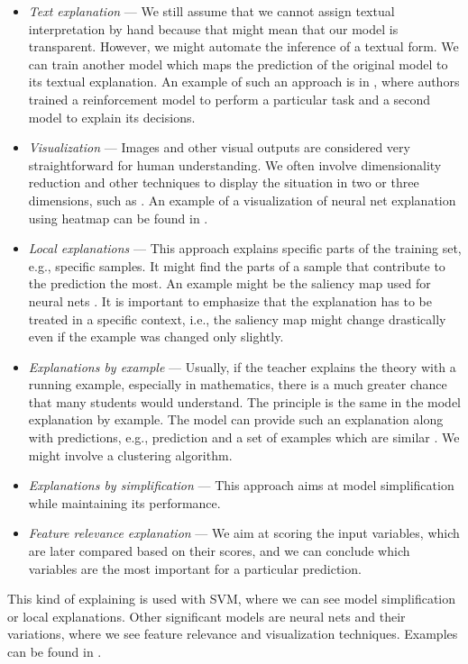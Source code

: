 \begin{itemize}
    \itemsep0em 
    \item \emph{Text explanation} --- We still assume that we cannot assign textual interpretation by hand because that might mean that our model is transparent. However, we might automate the inference of a textual form. We can train another model which maps the prediction of the original model to its textual explanation. An example of such an approach is in \cite{Krening2017}, where authors trained a reinforcement model to perform a particular task and a second model to explain its decisions.
    \item \emph{Visualization} --- Images and other visual outputs are considered very straightforward for human understanding. We often involve dimensionality reduction and other techniques to display the situation in two or three dimensions, such as \cite{Pearson1901}. An example of a visualization of neural net explanation using heatmap can be found in \cite{Zeiler2013}.
    \item \emph{Local explanations} --- This approach explains specific parts of the training set, e.g.,  specific samples. It might find the parts of a sample that contribute to the prediction the most. An example might be the saliency map used for neural nets \cite{Simonyan2014}. It is important to emphasize that the explanation has to be treated in a specific context, i.e., the saliency map might change drastically even if the example was changed only slightly.
    \item \emph{Explanations by example} --- Usually, if the teacher explains the theory with a running example, especially in mathematics, there is a much greater chance that many students would understand. The principle is the same in the model explanation by example. The model can provide such an explanation along with predictions, e.g., prediction and a set of examples which are similar  \cite{Caruana1999}. We might involve a clustering algorithm.
    \item \emph{Explanations by simplification} --- This approach aims at model simplification while maintaining its performance.
    \item \emph{Feature relevance explanation} --- We aim at scoring the input variables, which are later compared based on their scores, and we can conclude which variables are the most important for a particular prediction.
\end{itemize}

This kind of explaining is used with SVM, where we can see model simplification or local explanations. Other significant models are neural nets and their variations, where we see feature relevance and visualization techniques. Examples can be found in \cite{Arrieta2019}.

